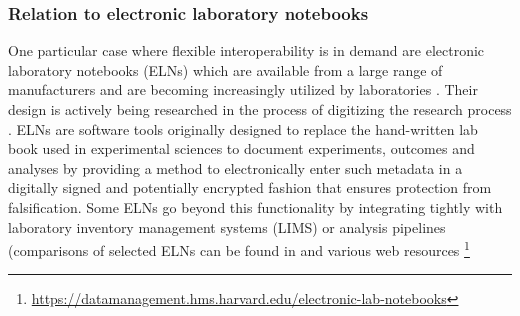 {\subsubsection{Relation to electronic laboratory notebooks}
One particular case where flexible interoperability is in demand are electronic laboratory notebooks (ELNs) which are available from a large range of manufacturers and are becoming increasingly utilized by laboratories \citep{Kwok_2018}. Their design is actively being researched in the process of digitizing the research process \citep{Kanza_2017}. ELNs are software tools originally designed to replace the hand-written lab book used in experimental sciences to document experiments, outcomes and analyses by providing a method to electronically enter such metadata in a digitally signed and potentially encrypted fashion that ensures protection from falsification. Some ELNs go beyond this functionality by integrating tightly with laboratory inventory management systems (LIMS) or analysis pipelines (comparisons of selected ELNs can be found in \citep{Rubacha_2011} and various web resources
\footnote{\url{https://datamanagement.hms.harvard.edu/electronic-lab-notebooks}}
}
